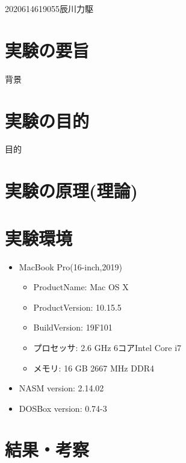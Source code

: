 \documentclass[12pt]{jarticle}
\begin{document}
{2020}{6}{1}{4619055}{辰川力駆}
\section{実験の要旨}
背景


\section{実験の目的}
目的
\section{実験の原理(理論)}

\section{実験環境}
\begin{itemize}
	\item MacBook Pro(16-inch,2019)
	      \begin{itemize}
		      \item ProductName: Mac OS X
		      \item ProductVersion:	10.15.5
		      \item BuildVersion: 19F101
		      \item プロセッサ: 2.6 GHz 6コアIntel Core i7
		      \item メモリ: 16 GB 2667 MHz DDR4
	      \end{itemize}
	\item NASM version: 2.14.02
	\item DOSBox version: 0.74-3
\end{itemize}

\clearpage

\section{結果・考察}
\end{document}
